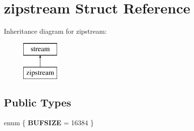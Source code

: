 \hypertarget{structzipstream}{}\section{zipstream Struct Reference}
\label{structzipstream}
Inheritance diagram for zipstream\+:\begin{figure}[H]
\begin{center}
\leavevmode
\includegraphics[height=2.000000cm]{structzipstream}
\end{center}
\end{figure}
\subsection*{Public Types}
\begin{DoxyCompactItemize}
\item 
\mbox{\label{structzipstream_a5e90c3161e6d36375925d98da1fb7c98}} 
enum \{ {\bfseries B\+U\+F\+S\+I\+ZE} = 16384
 \}
\end{DoxyCompactItemize}
